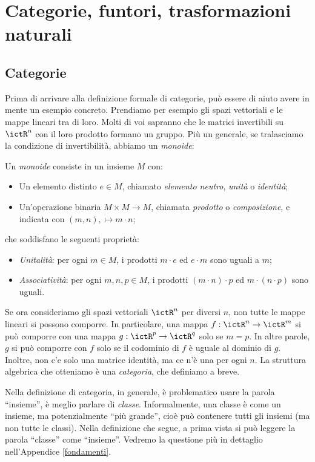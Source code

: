 \chapter{Categorie, funtori, trasformazioni naturali}

\section{Categorie}\label{categorie}

Prima di arrivare alla definizione formale di categorie, può essere di aiuto avere in mente un esempio concreto. Prendiamo per esempio gli spazi vettoriali e le mappe lineari tra di loro. 
Molti di voi sapranno che le matrici invertibili su $\ictR^n$ con il loro prodotto formano un gruppo. Più un generale, se tralasciamo la condizione di invertibilità, abbiamo un \emph{monoide}:

\begin{definition}
 Un \emph{monoide} consiste in un insieme $M$ con:
 \begin{itemize}
  \item Un elemento distinto $e\in M$, chiamato \emph{elemento neutro}, \emph{unità} o \emph{identità};
  \item Un'operazione binaria $M\times M\to M$, chiamata \emph{prodotto} o \emph{composizione}, e indicata con $(m,n),\mapsto m\cdot n$;
 \end{itemize}
 che soddisfano le seguenti proprietà:
 \begin{itemize}
  \item \emph{Unitalità}: per ogni $m\in M$, i prodotti $m \cdot e$ ed $e\cdot m$ sono uguali a $m$;
  \item \emph{Associatività}: per ogni $m,n,p\in M$, i prodotti $(m\cdot n)\cdot p$ ed $m\cdot (n\cdot p)$ sono uguali. 
 \end{itemize}
\end{definition}

Se ora consideriamo gli spazi vettoriali $\ictR^n$ per diversi $n$, non tutte le mappe lineari si possono comporre. In particolare, una mappa $f:\ictR^n\to \ictR^m$ si può comporre con una mappa $g:\ictR^p\to\ictR^q$ solo se $m=p$. In altre parole, $g$ si può comporre con $f$ solo se il codominio di $f$ è uguale al dominio di $g$.
Inoltre, non c'e solo una matrice identità, ma ce n'è una per ogni $n$. 
La struttura algebrica che otteniamo è una \emph{categoria}, che definiamo a breve.

Nella definizione di categoria, in generale, è problematico usare la parola ``insieme'', è meglio parlare di \emph{classe}. Informalmente, una classe è come un insieme, ma potenzialmente ``più grande'', cioè può contenere tutti gli insiemi (ma non tutte le classi). 
Nella definizione che segue, a prima vista si può leggere la parola ``classe'' come ``insieme''. Vedremo la questione più in dettaglio nell'Appendice \ref{fondamenti}. 

